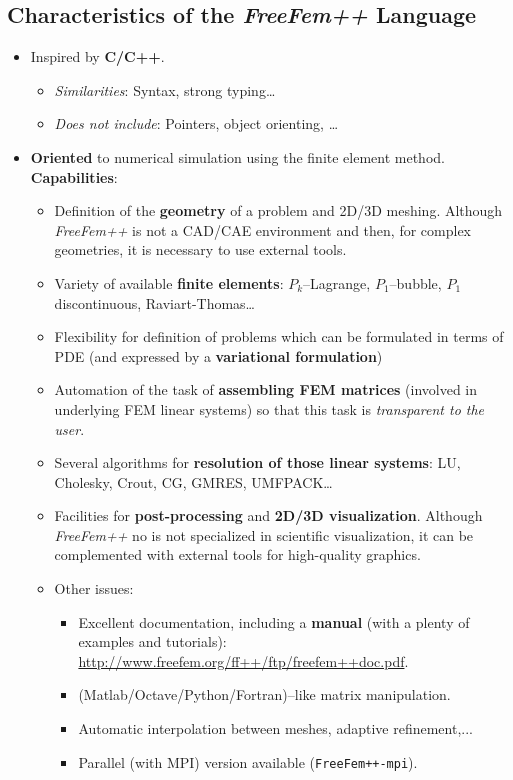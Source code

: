 \documentclass[12pt]{article}
\providecommand{\alert}[1]{\textbf{#1}}
\newcommand{\FF}{\textit{FreeFem++}\xspace}
\begin{document}
\subsection{Characteristics  of the \FF Language}
\begin{itemize}

\item Inspired by \alert{C/C++}.
  \begin{itemize}
  \item \emph{Similarities}: Syntax, strong typing\ldots{}
  \item \emph{Does not include}: Pointers, object orienting, \ldots{}
  \end{itemize}

\item \alert{Oriented} to numerical simulation using the finite element method.
  \alert{Capabilities}:
  \begin{itemize}
  \item Definition of the \textbf{geometry} of a problem and 2D/3D meshing.
    Although \FF is not a CAD/CAE environment and then, for complex
    geometries, it is necessary to use external tools.
  \item Variety of available \alert{finite elements}:
    $P_k$--Lagrange, $P_1$--bubble, $P_1$ discontinuous,
    Raviart-Thomas\ldots{}
  \item Flexibility for definition of problems which can be formulated
    in terms of PDE (and expressed by a \alert{variational formulation})
  \item Automation of the task of \textbf{assembling FEM matrices} (involved in
    underlying FEM linear systems) so that this task is \textit{transparent to the
    user}.
  \item Several algorithms for \alert{resolution of those linear
      systems}: LU, Cholesky, Crout, CG, GMRES, UMFPACK\ldots{}
  \item Facilities for \alert{post-processing} and \alert{2D/3D
      visualization}.  Although \FF no is not specialized in
    scientific visualization, it can be complemented with external
    tools for high-quality graphics.
  \item Other issues:
    \begin{itemize}
    \item Excellent documentation, including a \textbf{manual} (with a
      plenty of examples and tutorials):
      \url{http://www.freefem.org/ff++/ftp/freefem++doc.pdf}.
    \item (Matlab/Octave/Python/Fortran)--like matrix manipulation.
    \item Automatic interpolation between meshes, adaptive refinement,...
    \item Parallel (with MPI) version available
      (\texttt{FreeFem++-mpi}).
    \end{itemize}
  \end{itemize}

\end{itemize} %
\end{document}

